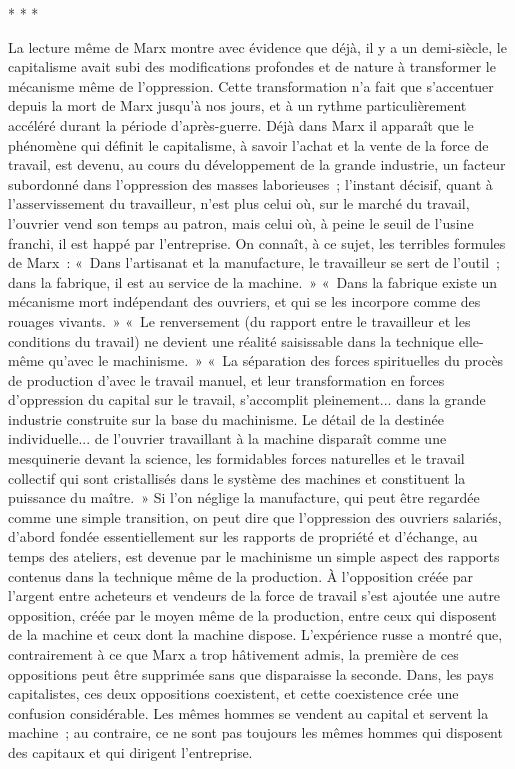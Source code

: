 \documentclass[french,twoside]{book} %
\begin{document}
\begin{center}
* * *\end{center}
\noindent La lecture même de Marx montre avec évidence que déjà, il y a un demi-siècle, le capitalisme avait subi des modifications profondes et de nature à transformer le mécanisme même de l'oppression. Cette transformation n'a fait que s'accentuer depuis la mort de Marx jusqu'à nos jours, et à un rythme particulièrement accéléré durant la période d'après-guerre. Déjà dans Marx il apparaît que le phénomène qui définit le capitalisme, à savoir l'achat et la vente de la force de travail, est devenu, au cours du développement de la grande industrie, un facteur subordonné dans l'oppression des masses laborieuses ; l'instant décisif, quant à l'asservissement du travailleur, n'est plus celui où, sur le marché du travail, l'ouvrier vend son temps au patron, mais celui où, à peine le seuil de l'usine franchi, il est happé par l'entreprise. On connaît, à ce sujet, les terribles formules de Marx : « Dans l'artisanat et la manufacture, le travailleur se sert de l'outil ; dans la fabrique, il est au service de la machine. » « Dans la fabrique existe un mécanisme mort indépendant des ouvriers, et qui se les incorpore comme des rouages vivants. » « Le renversement (du rapport entre le travailleur et les conditions du travail) ne devient une réalité saisissable dans la technique elle-même qu'avec le machinisme. » « La séparation des forces spirituelles du procès de production d'avec le travail manuel, et leur transformation en forces d'oppression du capital sur le travail, s'accomplit pleinement... dans la grande industrie construite sur la base du machinisme. Le détail de la destinée individuelle... de l'ouvrier travaillant à la machine disparaît comme une mesquinerie devant la science, les formidables forces naturelles et le travail collectif qui sont cristallisés dans le système des machines et constituent la puissance du maître. » Si l'on néglige la manufacture, qui peut être regardée comme une simple transition, on peut dire que l'oppression des ouvriers salariés, d'abord fondée essentiellement sur les rapports de propriété et d'échange, au temps des ateliers, est devenue par le machinisme un simple aspect des rapports contenus dans la technique même de la production. À l'opposition créée par l'argent entre acheteurs et vendeurs de la force de travail s'est ajoutée une autre opposition, créée par le moyen même de la production, entre ceux qui disposent de la machine et ceux dont la machine dispose. L'expérience russe a montré que, contrairement à ce que Marx a trop hâtivement admis, la première de ces oppositions peut être supprimée sans que disparaisse la seconde. Dans, les pays capitalistes, ces deux oppositions coexistent, et cette coexistence crée une confusion considérable. Les mêmes hommes se vendent au capital et servent la machine ; au contraire, ce ne sont pas toujours les mêmes hommes qui disposent des capitaux et qui dirigent l'entreprise.\par
\end{document}
